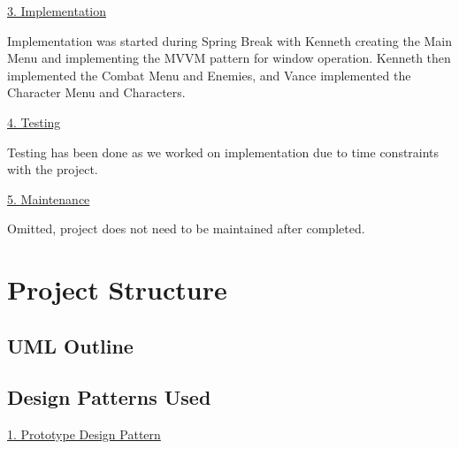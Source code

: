 \documentclass[10pt,conference,onecolumn,compsoc]{IEEEtran}
\begin{document}
\underline{3. Implementation}
\vspace{5px}

Implementation was started during Spring Break with Kenneth creating the Main Menu and implementing the MVVM pattern for window operation. Kenneth then implemented the Combat Menu and Enemies, and Vance implemented the Character Menu and Characters.

\underline{4. Testing}
\vspace{5px}

Testing has been done as we worked on implementation due to time constraints with the project.

\underline{5. Maintenance}
\vspace{5px}

Omitted, project does not need to be maintained after completed.


\section{Project Structure}

\subsection{UML Outline}



\subsection{Design Patterns Used}
\underline{1. Prototype Design Pattern}
\vspace{5px}
\end{document}
